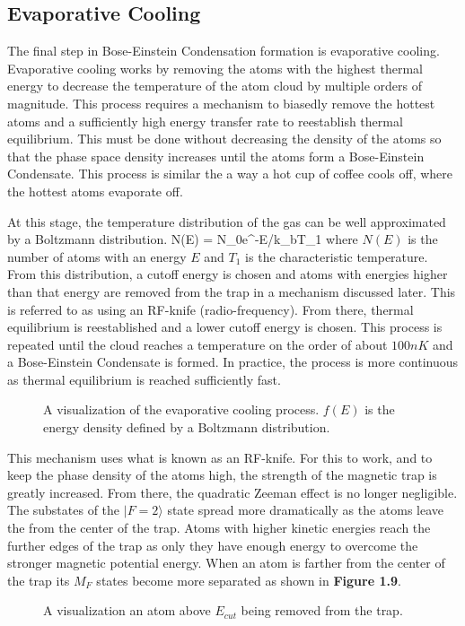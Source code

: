 \subsection{Evaporative Cooling}
The final step in Bose-Einstein Condensation formation is evaporative cooling. Evaporative cooling works by removing the atoms with the highest thermal energy to decrease the temperature of the atom cloud by multiple orders of magnitude. This process requires a mechanism to biasedly remove the hottest atoms and a sufficiently high energy transfer rate to reestablish thermal equilibrium. This must be done without decreasing the density of the atoms so that the phase space density increases until the atoms form a Bose-Einstein Condensate. This process is similar the a way a hot cup of coffee cools off, where the hottest atoms evaporate off. 

At this stage, the temperature distribution of the gas can be well approximated by a Boltzmann distribution.
\beq
N(E) = N_0e^{-E/k_bT_1}
\eeq 
where $N(E)$ is the number of atoms with an energy $E$ and $T_1$ is the characteristic temperature. From this distribution, a cutoff energy is chosen and atoms with energies higher than that energy are removed from the trap in a mechanism discussed later. This is referred to as using an RF-knife (radio-frequency). From there, thermal equilibrium is reestablished and a lower cutoff energy is chosen. This process is repeated until the cloud reaches a temperature on the order of about $100nK$ and a Bose-Einstein Condensate is formed. In practice, the process is more continuous as thermal equilibrium is reached sufficiently fast. 

\begin{figure}[h!]
\begin{center}
\end{center}
\caption{A visualization of the evaporative cooling process. $f(E)$ is the energy density defined by a Boltzmann distribution. \cite{foot} }
\end{figure}

This mechanism uses what is known as an RF-knife. For this to work, and to keep the phase density of the atoms high, the strength of the magnetic trap is greatly increased. From there, the quadratic Zeeman effect is no longer negligible. The substates of the $|F=2\rangle$ state spread more dramatically as the atoms leave the from the center of the trap. Atoms with higher kinetic energies reach the further edges of the trap as only they have enough energy to overcome the stronger magnetic potential energy. When an atom is farther from the center of the trap its $M_F$ states become more separated as shown in \textbf{Figure 1.9}. 
\begin{figure}[h!]
\begin{center}
\end{center}
\caption{A visualization an atom above $E_{cut}$ being removed from the trap. \cite{bouyer} }
\end{figure}

